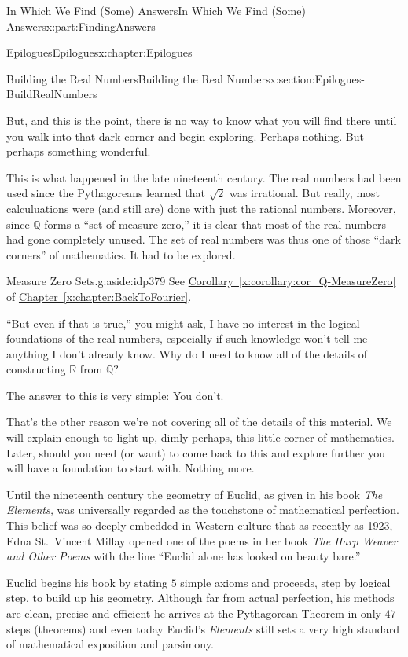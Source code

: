 \documentclass[oneside,10pt,]{book}
\newcommand{\xreffont}{\relax}
\numberwithin{equation}{section}
\newcommand{\RR}{\mathbb {R}}
\newcommand{\QQ}{\mathbb {Q}}
\begin{document}
\begin{partptx}{In Which We Find (Some) Answers}{}{In Which We Find (Some) Answers}{}{}{x:part:FindingAnswers}
\begin{chapterptx}{Epilogues}{}{Epilogues}{}{}{x:chapter:Epilogues}
\begin{sectionptx}{Building the Real Numbers}{}{Building the Real Numbers}{}{}{x:section:Epilogues-BuildRealNumbers}
\begin{introduction}{}
But, and this is the point, there is no way to know what you will find there until you walk into that dark corner and begin exploring.  Perhaps nothing.  But perhaps something wonderful.%
\par
This is what happened in the late nineteenth century.  The real numbers had been used since the Pythagoreans learned that \(\sqrt{2}\) was irrational.  But really, most calculuations were (and still are) done with just the rational numbers. Moreover, since \(\QQ\) forms a ``set of measure zero,''  it is clear that most of the real numbers had gone completely unused. The set of real numbers was thus one of those ``dark corners'' of mathematics. It had to be explored.%
\begin{aside}{Measure Zero Sets.}{g:aside:idp379}%
See \hyperref[x:corollary:cor_Q-MeasureZero]{Corollary~{\xreffont\ref{x:corollary:cor_Q-MeasureZero}}} of \hyperref[x:chapter:BackToFourier]{Chapter~{\xreffont\ref{x:chapter:BackToFourier}}}.%
\end{aside}
``But even if that is true,'' you might ask, \textasciigrave{}\textasciigrave{}I have no interest in the logical foundations of the real numbers, especially if such knowledge won't tell me anything I don't already know. Why do I need to know all of the details of constructing \(\RR\) from \(\QQ?\)%
\par
The answer to this is very simple: You don't.%
\par
That's the other reason we're not covering all of the details of this material. We will explain enough to light up, dimly perhaps, this little corner of mathematics. Later, should you need (or want) to come back to this and explore further you will have a foundation to start with. Nothing more.%
\par
Until the nineteenth century the geometry of Euclid, as given in his book \emph{The Elements,} was universally regarded as the touchstone of mathematical perfection. This belief was so deeply embedded in Western culture that as recently as 1923, Edna St.~Vincent Millay opened one of the poems in her book \emph{The Harp Weaver and Other Poems} with the line ``Euclid alone has looked on beauty bare.''%
\par
Euclid begins his book by stating \(5\) simple axioms and proceeds, step by logical step, to build up his geometry. Although far from actual perfection, his methods are clean, precise and efficient \textemdash{} he arrives at the Pythagorean Theorem in only \(47\) steps (theorems) \textemdash{} and even today Euclid's \emph{Elements} still sets a very high standard of mathematical exposition and parsimony.%

\end{introduction}
\end{sectionptx}
\end{chapterptx}
\end{partptx}
\end{document}
